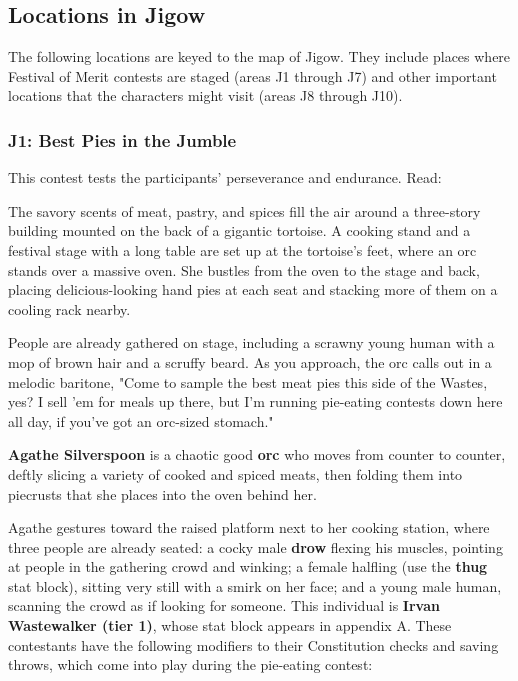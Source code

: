 \documentclass[10pt,a4paper,twoside,fancy,bg=print,twocolumn,openany,nodeprecatedcode]{dndbook}
\begin{document}
\subsection{Locations in Jigow}
The following locations are keyed to the map of Jigow. They include places where Festival of Merit contests are staged (areas J1 through J7) and other important locations that the characters might visit (areas J8 through J10).

\subsubsection{J1: Best Pies in the Jumble}
This contest tests the participants' perseverance and endurance. Read:

\begin{DndReadAloud}{}
The savory scents of meat, pastry, and spices fill the air around a three-story building mounted on the back of a gigantic tortoise. A cooking stand and a festival stage with a long table are set up at the tortoise's feet, where an orc stands over a massive oven. She bustles from the oven to the stage and back, placing delicious-looking hand pies at each seat and stacking more of them on a cooling rack nearby.

People are already gathered on stage, including a scrawny young human with a mop of brown hair and a scruffy beard. As you approach, the orc calls out in a melodic baritone, "Come to sample the best meat pies this side of the Wastes, yes? I sell 'em for meals up there, but I'm running pie-eating contests down here all day, if you've got an orc-sized stomach."

\end{DndReadAloud}

\textbf{Agathe Silverspoon} is a chaotic good \textbf{orc} who moves from counter to counter, deftly slicing a variety of cooked and spiced meats, then folding them into piecrusts that she places into the oven behind her.

Agathe gestures toward the raised platform next to her cooking station, where three people are already seated: a cocky male \textbf{drow} flexing his muscles, pointing at people in the gathering crowd and winking; a female halfling (use the \textbf{thug} stat block), sitting very still with a smirk on her face; and a young male human, scanning the crowd as if looking for someone. This individual is \textbf{Irvan Wastewalker (tier 1)}, whose stat block appears in appendix A. These contestants have the following modifiers to their Constitution checks and saving throws, which come into play during the pie-eating contest:
\end{document}
